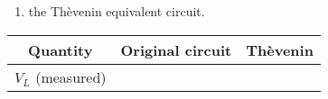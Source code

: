 \begin{enumerate}
\begin{enumerate}
\begin{enumerate}
   \item the Th\`{e}venin equivalent circuit. 
   \end{enumerate}
   \begin{center}
     \begin{tabular}{|c|c|c|}
       \toprule
       Quantity & Original circuit & Th\`{e}venin\\
       \toprule
       $V_L$ (measured) & & \\
       \bottomrule
     \end{tabular}     
   \end{center}


 \end{enumerate}
\end{enumerate}
 

